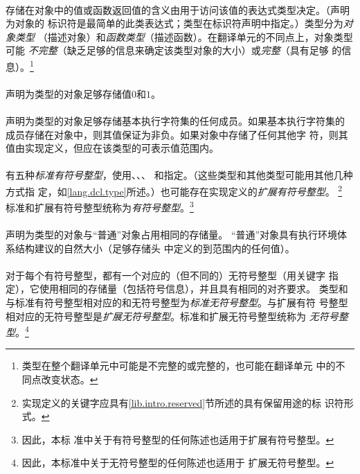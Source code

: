 {                                                 
\paragraph{}
存储在对象中的值或函数返回值的含义由用于访问该值的表达式类型决定。（声明为对象的
标识符是最简单的此类表达式；类型在标识符声明中指定。）类型分为\textit{对象类型}
（描述对象）和\textit{函数类型}（描述函数）。在翻译单元的不同点上，对象类型可能
\textit{不完整}（缺乏足够的信息来确定该类型对象的大小）或\textit{完整}（具有足够
的信息）。\footnote{类型在整个翻译单元中可能是不完整的或完整的，也可能在翻译单元
中的不同点改变状态。}

\paragraph{}
声明为类型的对象足够存储值$0$和$1$。

\paragraph{}
声明为类型的对象足够存储基本执行字符集的任何成员。如果基本执行字符集的
成员存储在对象中，则其值保证为非负。如果对象中存储了任何其他字
符，则其值由实现定义，但应在该类型的可表示值范围内。

\paragraph{}
有五种\textit{标准有符号整型}，使用、、、
和指定。（这些类型和其他类型可能用其他几种方式指
定，如\ref{lang.dcl.type}所述。）也可能存在实现定义的\textit{扩展有符号整型}。
\footnote{实现定义的关键字应具有\ref{lib.intro.reserved}节所述的具有保留用途的标
识符形式。} 标准和扩展有符号整型统称为\textit{有符号整型}。\footnote{因此，本标
准中关于有符号整型的任何陈述也适用于扩展有符号整型。}

\paragraph{}
声明为类型的对象与``普通''对象占用相同的存储量。
``普通''对象具有执行环境体系结构建议的自然大小（足够存储头
中定义的到范围内的任何值）。

\paragraph{}
对于每个有符号整型，都有一个对应的（但不同的）无符号整型（用关键字
指定），它使用相同的存储量（包括符号信息），并且具有相同的对齐要求。
类型和与标准有符号整型相对应的和无符号整型为\textit{标准无符号整型}。与扩展有符
号整型相对应的无符号整型是\textit{扩展无符号整型}。标准和扩展无符号整型统称为
\textit{无符号整型}。\footnote{因此，本标准中关于无符号整型的任何陈述也适用于
扩展无符号整型。}

}

